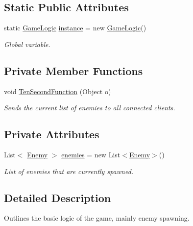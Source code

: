 \subsection*{Static Public Attributes}
\begin{DoxyCompactItemize}
\item 
static \mbox{\hyperlink{class_game_logic}{Game\+Logic}} \mbox{\hyperlink{class_game_logic_a96f4021dff11e0f67601a58893aafdff}{instance}} = new \mbox{\hyperlink{class_game_logic}{Game\+Logic}}()
\begin{DoxyCompactList}\small\item\em Global variable. \end{DoxyCompactList}\end{DoxyCompactItemize}
\subsection*{Private Member Functions}
\begin{DoxyCompactItemize}
\item 
void \mbox{\hyperlink{class_game_logic_a8dff4358d9aa75a58a2bc8dcbea4453a}{Ten\+Second\+Function}} (Object o)
\begin{DoxyCompactList}\small\item\em Sends the current list of enemies to all connected clients. \end{DoxyCompactList}\end{DoxyCompactItemize}
\subsection*{Private Attributes}
\begin{DoxyCompactItemize}
\item 
List$<$ \mbox{\hyperlink{class_enemy}{Enemy}} $>$ \mbox{\hyperlink{class_game_logic_a6545efc0f0cde3c2227195d7d74a2140}{enemies}} = new List$<$\mbox{\hyperlink{class_enemy}{Enemy}}$>$()
\begin{DoxyCompactList}\small\item\em List of enemies that are currently spawned. \end{DoxyCompactList}\end{DoxyCompactItemize}


\subsection{Detailed Description}
Outlines the basic logic of the game, mainly enemy spawning. 



